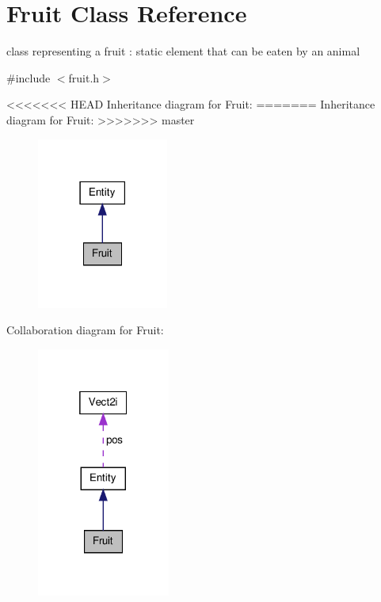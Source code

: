 \hypertarget{class_fruit}{\section{Fruit Class Reference}
\label{class_fruit}
}


class representing a fruit \-: static element that can be eaten by an animal  




{\ttfamily \#include $<$fruit.\-h$>$}



<<<<<<< HEAD
Inheritance diagram for Fruit\-:
\nopagebreak
=======
Inheritance diagram for Fruit\-:\nopagebreak
>>>>>>> master
\begin{figure}[H]
\begin{center}
\leavevmode
\includegraphics[width=122pt]{class_fruit__inherit__graph}
\end{center}
\end{figure}


Collaboration diagram for Fruit\-:
\nopagebreak
\begin{figure}[H]
\begin{center}
\leavevmode
\includegraphics[width=124pt]{class_fruit__coll__graph}
\end{center}
\end{figure}
